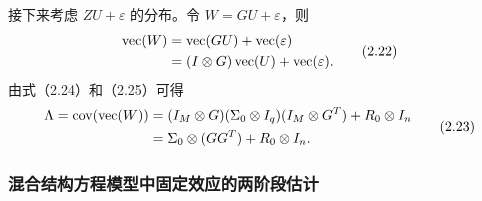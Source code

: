 接下来考虑 $ZU+\varepsilon$ 的分布。令 $W=GU+\varepsilon$，则
\begin{equation}
\begin{aligned}
\operatorname{vec}(W)&=\operatorname{vec}(GU)+\operatorname{vec}(\varepsilon)\\
&=(I\otimes G)\operatorname{vec}(U)+\operatorname{vec}(\varepsilon).
\end{aligned}\tag{2.22}
\end{equation}
由式（2.24）和（2.25）可得
\begin{equation}
\begin{aligned}
\Lambda=\operatorname{cov}(\operatorname{vec}(W))
 &=(I_M\otimes G)(\Sigma_0\otimes I_q)(I_M\otimes G^T)+R_0\otimes I_n\\
 &=\Sigma_0\otimes(GG^T)+R_0\otimes I_n.
\end{aligned}\tag{2.23}
\end{equation}

\subsubsection{混合结构方程模型中固定效应的两阶段估计}

